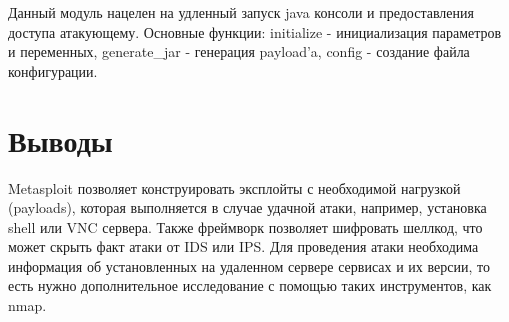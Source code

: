 \documentclass[10pt,a4paper]{article}
\begin{document}
Данный модуль нацелен на удленный запуск java консоли и предоставления доступа атакующему. Основные функции: initialize - инициализация параметров и переменных, generate_jar - генерация payload'a, config - создание файла конфигурации.
 
 
\section{Выводы} 
Metasploit позволяет конструировать эксплойты с необходимой нагрузкой (payloads), которая выполняется в случае удачной атаки, например, установка shell или VNC сервера. Также фреймворк позволяет шифровать шеллкод, что может скрыть факт атаки от IDS или IPS. Для проведения атаки необходима информация об установленных на удаленном сервере сервисах и их версии, то есть нужно дополнительное исследование с помощью таких инструментов, как nmap.

 
\end{document}
